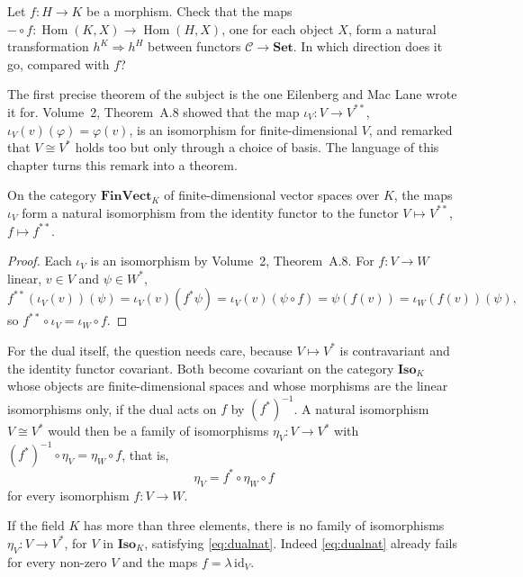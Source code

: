 \begin{think}
Let $f\colon H\to K$ be a morphism. Check that the maps $-\circ f\colon\operatorname{Hom}(K,X)\to\operatorname{Hom}(H,X)$, one for each object $X$, form a natural transformation $h^K\Rightarrow h^H$ between functors
$\mathcal C\to\mathbf{Set}$. In which direction does it go, compared with $f$?
\end{think}

The first precise theorem of the subject is the one Eilenberg and Mac Lane wrote it for. Volume~2, Theorem~A.8 showed that the map $\iota_V\colon V\to V^{**}$, $\iota_V(v)(\varphi)=\varphi(v)$,
is an isomorphism for finite-dimensional $V$, and remarked that $V\cong V^*$ holds too but only through a choice of basis. The language of this chapter turns this remark into a theorem.

\begin{theorem}\label{thm:bidualnat}
On the category $\mathbf{FinVect}_K$ of finite-dimensional vector spaces over $K$, the maps $\iota_V$ form a natural isomorphism from the identity functor to the functor $V\mapsto V^{**}$,
$f\mapsto f^{**}$.
\end{theorem}

\begin{proof}
Each $\iota_V$ is an isomorphism by Volume~2, Theorem~A.8. For $f\colon V\to W$ linear, $v\in V$ and $\psi\in W^*$,
\[f^{**}(\iota_V(v))(\psi)=\iota_V(v)(f^*\psi)=\iota_V(v)(\psi\circ f)=\psi(f(v))=\iota_W(f(v))(\psi),\]
so $f^{**}\circ\iota_V=\iota_W\circ f$.
\end{proof}

For the dual itself, the question needs care, because $V\mapsto V^*$ is contravariant and the identity functor covariant. Both become covariant on the category $\mathbf{Iso}_K$ whose objects are
finite-dimensional spaces and whose morphisms are the linear isomorphisms only, if the dual acts on $f$ by $(f^*)^{-1}$. A natural isomorphism $V\cong V^*$ would then be a family of
isomorphisms $\eta_V\colon V\to V^*$ with $(f^*)^{-1}\circ\eta_V=\eta_W\circ f$, that is,
\begin{equation}\label{eq:dualnat}
\eta_V=f^*\circ\eta_W\circ f
\end{equation}
for every isomorphism $f\colon V\to W$.

\begin{theorem}\label{thm:notnatural}
If the field $K$ has more than three elements, there is no family of isomorphisms $\eta_V\colon V\to V^*$, for $V$ in $\mathbf{Iso}_K$, satisfying \eqref{eq:dualnat}. Indeed \eqref{eq:dualnat} already fails
for every non-zero $V$ and the maps $f=\lambda\,\mathrm{id}_V$.
\end{theorem}

